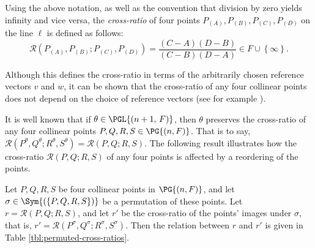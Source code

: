 Using the above notation, as well as the convention that division by zero yields infinity and vice versa, the \emph{cross-ratio} of four points $P_{\left(A \right)}, P_{\left(B \right)}, P_{\left(C \right)}, P_{\left(D \right)}$ on the line $\ell$ is defined as follows:
\begin{displaymath}
\mathcal{R} {\left(P_{\left(A \right)}, P_{\left(B \right)}; P_{\left(C \right)}, P_{\left(D \right)}\right)} = \frac{\left(C-A \right) \left(D-B \right)}{\left(C-B \right) \left(D-A \right)} \in F \cup \left\{\infty \right\}.
\end{displaymath}

Although this defines the cross-ratio in terms of the arbitrarily chosen reference vectors $v$ and $w$, it can be shown that the cross-ratio of any four collinear points does not depend on the choice of reference vectors (see for example \cite[Section 3.5, Theorem 1]{ref:garner-projective}).

It is well known that if $\theta \in \PGL{\left(n+1,\, F \right)}$, then $\theta$ preserves the cross-ratio of any four collinear points $P, Q, R, S \in \PG{\left(n, F \right)}$. That is to say, $\mathcal{R}{\left(P^\theta, Q^\theta; R^\theta, S^\theta \right)} = \mathcal{R}{\left(P, Q; R, S \right)}$. The following result \cite[Lemma 4.4]{ref:bamberg-analytic} illustrates how the cross-ratio $\mathcal{R} {\left(P, Q; R, S \right)}$ of any four points is affected by a reordering of the points.

\begin{lemma} \label{lm:permute-cross-ratio}
Let $P, Q, R, S$ be four collinear points in $\PG{\left(n, F \right)}$, and let $\sigma \in \Sym{\left(\left\{P, Q, R, S \right\}\right)}$ be a permutation of these points. Let $r = \mathcal{R}{\left(P, Q; R, S \right)}$, and let $r'$ be the cross-ratio of the points' images under $\sigma$, that is, $r' = \mathcal{R}{\left(P^\sigma, Q^\sigma; R^\sigma, S^\sigma \right)}$. Then the relation between $r$ and $r'$ is given in Table \ref{tbl:permuted-cross-ratios}.
\end{lemma}


